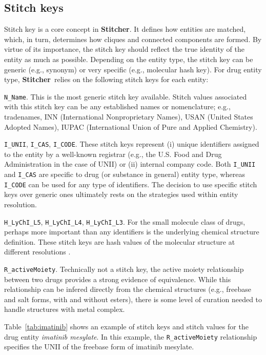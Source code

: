 \documentclass{bioinfo}
\newcommand\st{\textbf{Stitcher}}
\begin{document}
\subsection{Stitch keys}
Stitch key is a core concept in \st. It defines how entities are matched, which, in turn, determines how cliques and connected components are formed. By virtue of its importance, the stitch key should reflect the true identity of the entity as much as possible. Depending on the entity type, the stitch key can be generic (e.g., synonym) or very specific (e.g., molecular hash key). For drug entity type, \st\ relies on the following stitch keys for each entity:
\begin{unlist}
\item{\texttt{N\_Name}.} This is the most generic stitch key available. Stitch values associated with this stitch key can be any established names or nomenclature; e.g., tradenames, INN (International Nonproprietary Names), USAN (United States Adopted Names), IUPAC (International Union of Pure and Applied Chemistry).
\item{\texttt{I\_UNII}, \texttt{I\_CAS}, \texttt{I\_CODE}.} These stitch keys represent (i) unique identifiers assigned to the entity by a well-known registrar (e.g., the U.S. Food and Drug Administration in the case of UNII) or (ii) internal company code. Both \texttt{I\_UNII} and \texttt{I\_CAS} are specific to drug (or substance in general) entity type, whereas \texttt{I\_CODE} can be used for any type of identifiers. The decision to use specific stitch keys over generic ones ultimately rests on the strategies used within entity resolution.
\item{\texttt{H\_LyChI\_L5}, \texttt{H\_LyChI\_L4}, \texttt{H\_LyChI\_L3}.} For the small molecule class of drugs, perhaps more important than any identifiers is the underlying chemical structure definition. These stitch keys are hash values of the molecular structure at different resolutions \citep{lychi2019}.
\item{\texttt{R\_activeMoiety}.} Technically not a stitch key, the active moiety relationship between two drugs provides a strong evidence of equivalence. While this relationship can be infered directly from the chemical structures (e.g., freebase and salt forms, with and without esters), there is some level of curation needed to handle structures with metal complex.
\end{unlist}
Table~\ref{tab:imatinib} shows an example of stitch keys and stitch values for
the drug entity \emph{imatinib mesylate}. In this example, the \texttt{R\_activeMoiety} relationship specifies the UNII of the freebase form of imatinib mesylate.
\end{document}

